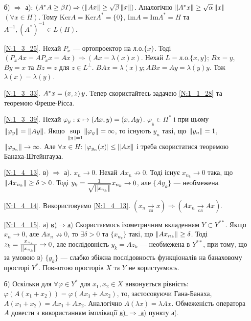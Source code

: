 \noindent б) $\Rightarrow$ а): $(A^* A \geq \beta I) \Rightarrow (\left\lVert Ax\right\rVert \geq 
\sqrt{\beta}\left\lVert x\right\rVert)$. Аналогічно $\left\lVert A^* x\right\rVert \geq \sqrt{\alpha}\left\lVert x\right\rVert$ $(\forall x \in H)$.
Тому $\mathrm{Ker}A = \mathrm{Ker}A^* = \{0\}$, $\mathrm{Im}A = \mathrm{Im}A^* = H$ та
$A^{-1}, (A^*)^{-1} \in L(H)$.

\noindent\ref{N:1_3_25}. Нехай $P_x$ --- ортопроектор на л.о.$\{x\}$. Тоді $(P_x Ax = 
AP_x x = Ax) \Rightarrow (Ax = \lambda(x)x)$. Нехай $L = \text{л.о.}\{x,y\}$;
$Bx = y$, $By = x$ та $Bz = z$ для $z \in L^\perp$. $BAx = \lambda(x)y; ABx = Ay = \lambda(y)y$.
Тож $\lambda(x) = \lambda(y)$.

\noindent\ref{N:1_3_33}. $A^* x = \left(x, z\right)y$. Тепер скористайтесь задачею \ref{N:1_1_28}
та теоремою Фреше-Рісса.

\noindent\ref{N:1_3_39}. Нехай $\varphi_y: x \mapsto \left(Ax, y\right) = \left(x, Ay\right)$.
$\varphi_y \in H^*$ і при цьому $\left\lVert\varphi_y\right\rVert = \left\lVert Ay\right\rVert$. Якщо 
$\underset{\left\lVert y\right\rVert=1}{\sup} \left\lVert\varphi_y\right\rVert = \infty$, то існують $y_n$ такі,
що $\left\lVert y_n\right\rVert = 1$, $\left\lVert\varphi_{y_n}\right\rVert \to \infty$.
Але $\forall x \in H$: $|\varphi_{y_n}(x)| \leq \left\lVert Ax\right\rVert$ і треба скористатися теоремою Банаха-Штейнгауза.

\noindent\ref{N:1_4_13}. в) $\Rightarrow$ а). $x_n \rightarrow 0$. Нехай $A x_n \not\rightarrow 0$. Тоді існує
$x_{n_k} \rightarrow 0$ така, що $\left\lVert A x_{n_k}\right\rVert \geq \delta > 0$. Тоді 
$y_k = \frac{1}{\sqrt{\left\lVert x_{n_k}\right\rVert}} x_{n_k} \rightarrow 0$, але $\{A y_k\}$ --- необмежена.

\noindent\ref{N:1_4_14}. Використовуємо \ref{N:1_4_13}. $(x_n \xrightarrow[\text{сл}]{} x) \Rightarrow (Ax_n \xrightarrow[\text{сл}]{} Ax)$.

\noindent\ref{N:1_4_15}. а) \ul{в)$\Rightarrow$а)} Скористаємось ізометричним вкладенням $Y \subset 
Y^{**}$. Якщо $x_n \rightarrow 0$, але $Ax_n \nrightarrow 0$, то $\exists \delta > 0$ та 
$\{x_{n_k}\}$ такі, що $\left\lVert Ax_{n_k}\right\rVert \geq \delta$. Тоді $z_k = 
\frac{x_{n_k}}{\left\lVert x_{n_k}\right\rVert} \rightarrow 0$, але послідовність $y_k = Az_k$ --- необмежена 
в $Y^{**}$, при тому, що за умовою в) $\{y_k\}$ --- слабко збіжна послідовность функціоналів на 
банаховому просторі $Y^*$. Повнотою просторів $X$ та $Y$ не користуємось.

\noindent б) Оскільки для $\forall \varphi \in Y^*$ для $x_1, x_2 \in X$ 
виконується рівність: $\varphi(A(x_1 + x_2)) = \varphi(Ax_1 + Ax_2)$, то, застосовуючи Гана-Банаха, 
$A(x_1 + x_2) = Ax_1 + Ax_2$. Аналогічно $A(\lambda x) = \lambda Ax$. Обмеженість оператора $A$ 
довести з використанням імплікації \ul{в) $\Rightarrow$ а)} пункту а).

